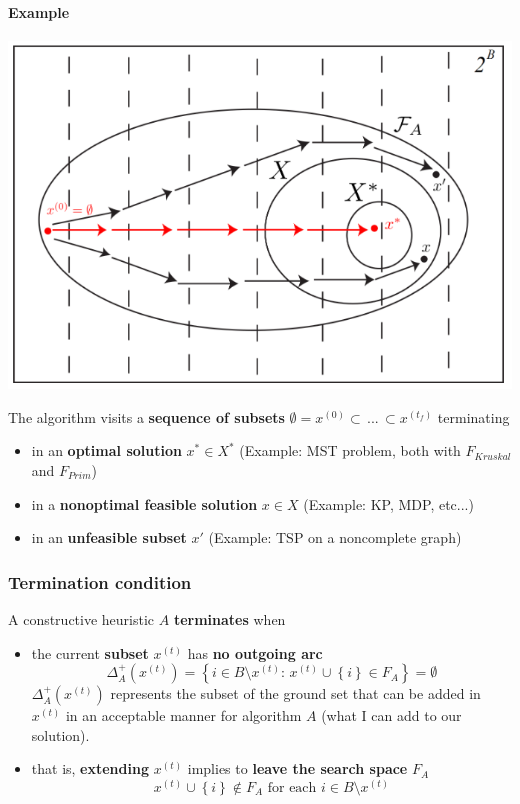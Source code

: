 \documentclass[11pt]{article}
\begin{document}
	\paragraph{Example}
	\begin{center}
		\includegraphics[width=0.8\columnwidth]{img/CGraph1}
	\end{center}
	The algorithm visits a \textbf{sequence of subsets} $\emptyset = x^{(0)} \subset \, ... \, \subset x^{(t_f)}$ terminating
	\begin{itemize}
		\item in an \textbf{optimal solution} $x^\ast \in X^\ast$ (Example: MST problem, both with $F_{Kruskal}$ and $F_{Prim}$)
		\item in a \textbf{nonoptimal feasible solution} $x \in X$ (Example: KP, MDP, etc...)
		\item in an \textbf{unfeasible subset} $x'$ (Example: TSP on a noncomplete graph)
	\end{itemize}
	
	\newpage
	
	\subsubsection{Termination condition} 
	A constructive heuristic $A$ \textbf{terminates} when
	\begin{itemize}
		\item the current \textbf{subset} $x^{(t)}$ has \textbf{no outgoing arc}
		$$ \Delta^+_A \left(x^{(t)}\right) = \left\{i \in B \setminus x^{(t)} : \, x^{(t)} \cup \left\{i\right\} \in F_A \right\} = \emptyset $$
		$\Delta^+_A \left(x^{(t)}\right)$ represents the subset of the ground set that can be added in $x^{(t)}$ in an acceptable manner for algorithm $A$ (what I can add to our solution).\\
		
		\item that is, \textbf{extending} $x^{(t)}$ implies to \textbf{leave the search space} $F_A$
		$$ x^{(t)} \cup \left\{i\right\} \notin F_A \text{ for each } i \in B \setminus x^{(t)}$$
	\end{itemize}
	
\end{document}
